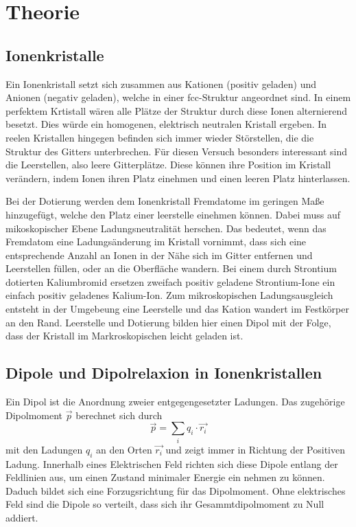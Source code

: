 \section{Theorie}
\label{sec:Theorie}



\subsection{Ionenkristalle}
Ein Ionenkristall setzt sich zusammen aus Kationen (positiv geladen) und Anionen (negativ geladen),
welche in einer fcc-Struktur angeordnet sind.
In einem perfektem Krtistall wären alle Plätze der Struktur durch diese Ionen alternierend besetzt.
Dies würde ein homogenen, elektrisch neutralen Kristall ergeben.
In reelen Kristallen hingegen befinden sich immer wieder Störstellen,
die die Struktur des Gitters unterbrechen.
Für diesen Versuch besonders interessant sind die Leerstellen,
also leere Gitterplätze.
Diese können ihre Position im Kristall verändern,
indem Ionen ihren Platz einehmen und einen leeren Platz hinterlassen.

Bei der Dotierung werden dem Ionenkristall Fremdatome im geringen Maße hinzugefügt,
welche den Platz einer leerstelle einehmen können.
Dabei muss auf mikoskopischer Ebene Ladungsneutralität herschen.
Das bedeutet,
wenn das Fremdatom eine Ladungsänderung im Kristall vornimmt,
dass sich eine entsprechende Anzahl an Ionen in der Nähe sich im Gitter entfernen und Leerstellen füllen,
oder an die Oberfläche wandern.
Bei einem durch Strontium dotierten Kaliumbromid
ersetzen zweifach positiv geladene Strontium-Ione ein einfach positiv geladenes Kalium-Ion.
Zum mikroskopischen Ladungsausgleich entsteht in der Umgebeung eine Leerstelle 
und das Kation wandert im Festkörper an den Rand.
Leerstelle und Dotierung bilden hier einen Dipol mit der Folge, 
dass der Kristall im Markroskopischen leicht geladen ist. 



\subsection{Dipole und Dipolrelaxion in Ionenkristallen}
Ein Dipol ist die Anordnung zweier entgegengesetzter Ladungen.
Das zugehörige Dipolmoment $\vec{p}$ berechnet sich durch
\begin{equation*}
    \vec{p} = \sum_i q_i \cdot \vec{r_i}
\end{equation*}
mit den Ladungen $q_i$ an den Orten $\vec{r_i}$ 
und zeigt immer in Richtung der Positiven Ladung.
Innerhalb eines Elektrischen Feld richten sich diese Dipole entlang der Feldlinien aus,
um einen Zustand minimaler Energie ein nehmen zu können.
Daduch bildet sich eine Forzugsrichtung für das Dipolmoment.
Ohne elektrisches Feld sind die Dipole so verteilt, 
dass sich ihr Gesammtdipolmoment zu Null addiert.

